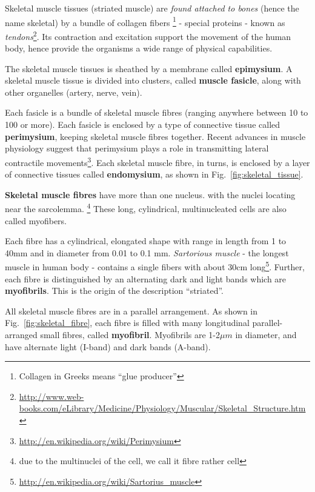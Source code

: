 Skeletal muscle tissues (striated muscle) are {\it found attached to bones}
(hence the name skeletal)  by a bundle of collagen fibers \footnote{Collagen in
Greeks means ``glue
  producer''}  - special proteins - known as
{\it
tendons}\footnote{\url{http://www.web-books.com/eLibrary/Medicine/Physiology/Muscular/Skeletal_Structure.htm}}.
Its contraction and excitation support the movement of the human body, hence
provide the organisms a wide range of physical capabilities.

The skeletal muscle tissues is sheathed by a membrane called {\bf epimysium}. A
skeletal muscle tissue is divided into clusters, called {\bf muscle fasicle},
along with other organelles (artery, nerve, vein).


Each fasicle is a bundle of skeletal muscle fibres  (ranging anywhere between 10
to 100 or more). Each fasicle is enclosed by a type of connective tissue called
{\bf perimysium}, keeping skeletal muscle fibres together. Recent advances in
muscle physiology suggest that perimysium plays a role in transmitting lateral
contractile movements\footnote{\url{http://en.wikipedia.org/wiki/Perimysium}}.
Each skeletal muscle fibre, in turns, is enclosed by a layer of connective
tissues called {\bf endomysium}, as shown in Fig.~\ref{fig:skeletal_tissue}.

{\bf Skeletal muscle fibres} have more than one nucleus. with the nuclei
locating near the sarcolemma. \footnote{due to the multinuclei of the cell, we call it fibre
rather cell}
These long, cylindrical, multinucleated cells are also called myofibers.
  
Each fibre has a cylindrical, elongated
shape with range in length from 1 to 40mm and in diameter from 0.01 to
0.1 mm. {\it Sartorious muscle} - the longest muscle in human body -
contains a single fibers with about 30cm
long\footnote{\url{http://en.wikipedia.org/wiki/Sartorius_muscle}}.
Further, each fibre is distinguished by an alternating dark and light
bands which are {\bf myofibrils}. This is the origin of the
description ``striated''.  

All skeletal muscle fibres are in a parallel arrangement. As shown in
Fig.~\ref{fig:skeletal_fibre}, each fibre is filled with many longitudinal
parallel-arranged small fibres, called {\bf myofibril}. Myofibrils are 1-2$\mu
m$ in diameter, and have alternate light (I-band) and dark bands (A-band).
  


